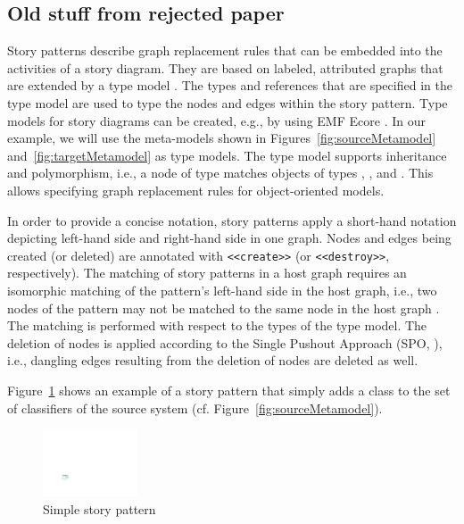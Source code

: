 

\subsection*{Old stuff from rejected paper}

Story patterns describe graph replacement rules that can be embedded into the activities of a story diagram. They are based on labeled, attributed graphs that are extended by a type model \cite{FNTZ00}. 
The types and references that are specified in the type model are used to type the nodes and edges within the story pattern.
Type models for story diagrams can be created, e.g., by using EMF Ecore \cite{SBP+08}.
In our example, we will use the meta-models shown in Figures~\ref{fig:sourceMetamodel} and~\ref{fig:targetMetamodel} as type models. The type model supports inheritance and polymorphism, i.e., a node of type  matches objects of types , , and .
This allows specifying graph replacement rules for object-oriented models.

In order to provide a concise notation, story patterns apply a short-hand notation depicting left-hand side and right-hand side in one graph. Nodes and edges being created (or deleted) are annotated with \small \verb|<<create>>| \normalsize (or  {\small \verb|<<destroy>>|\normalsize}, respectively). The matching of story patterns in a host graph requires an isomorphic matching of the pattern's left-hand side in the host graph, i.e., two nodes of the pattern may not be matched to the same node in the host graph \cite{FNTZ00,Roz97}. The matching is performed with respect to the types of the type model. The deletion of nodes is applied according to the Single Pushout Approach (SPO, \cite{Roz97}), i.e., dangling edges resulting from the deletion of nodes are deleted as well.

Figure~\ref{fig:SP} shows an example of a story pattern that simply adds a class to the set of classifiers of the source system (cf. Figure~\ref{fig:sourceMetamodel}).

\begin{figure}[htbp]
\begin{center}
  \includegraphics[width=0.25\textwidth]{figures/StoryPattern}
  \caption{Simple story pattern}
  \label{fig:SP}
\end{center}
\end{figure}
